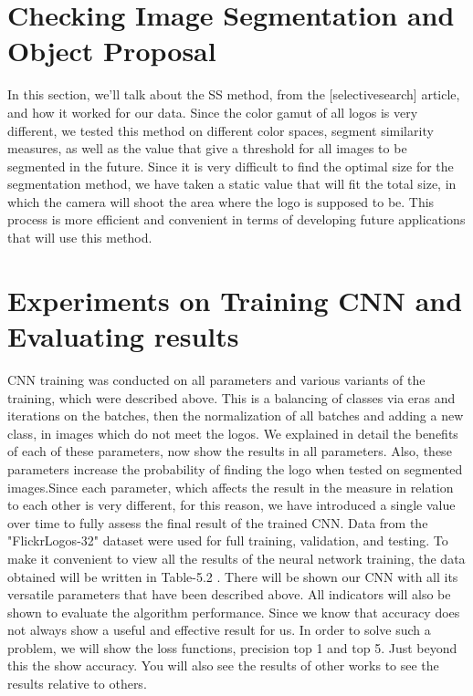 \noindent 

\vspace{-0.3cm}

\section{Checking Image Segmentation and Object Proposal}\label{sec:5.3}
\vspace{-0.5cm}
\noindent In this section, we'll talk about the SS method, from the [selectivesearch] article, and how it worked for our data. Since the color gamut of all logos is very different, we tested this method on different color spaces, segment similarity measures, as well as the value that give a threshold for all images to be segmented in the future. Since it is very difficult to find the optimal size for the segmentation method, we have taken a static value that will fit the total size, in which the camera will shoot the area where the logo is supposed to be. This process is more efficient and convenient in terms of developing future applications that will use this method.

\vspace{-0.3cm}

\section{Experiments on Training CNN and Evaluating results}\label{sec:5.4}
\vspace{-0.5cm}
\noindent CNN training was conducted on all parameters and various variants of the training, which were described above. This is a balancing of classes via eras and iterations on the batches, then the normalization of all batches and adding a new class, in images which do not meet the logos. We explained in detail the benefits of each of these parameters, now show the results in all parameters. Also, these parameters increase the probability of finding the logo when tested on segmented images.Since each parameter, which affects the result in the measure in relation to each other is very different, for this reason, we have introduced a single value over time to fully assess the final result of the trained CNN. Data from the "FlickrLogos-32" dataset were used for full training, validation, and testing. To make it convenient to view all the results of the neural network training, the data obtained will be written in Table-5.2 . There will be shown our CNN with all its versatile parameters that have been described above. All indicators will also be shown to evaluate the algorithm performance. Since we know that accuracy does not always show a useful and effective result for us. In order to solve such a problem, we will show the loss functions, precision top 1 and top 5. Just beyond this the show accuracy. You will also see the results of other works to see the results relative to others.



